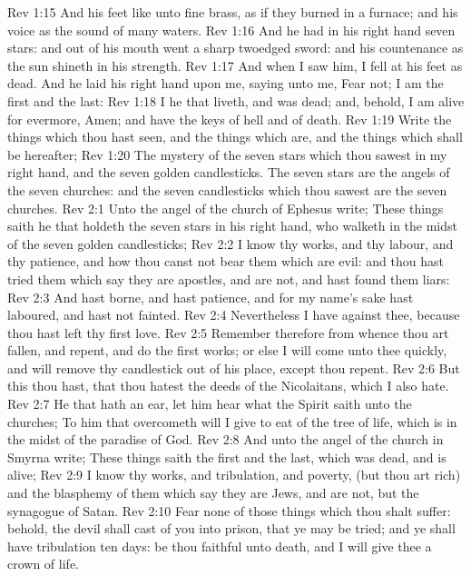 \vs Rev 1:15 And his feet like unto fine brass, as if they burned in a furnace; and his voice as the sound of many waters.
\vs Rev 1:16 And he had in his right hand seven stars: and out of his mouth went a sharp twoedged sword: and his countenance  as the sun shineth in his strength.
\vs Rev 1:17 And when I saw him, I fell at his feet as dead. And he laid his right hand upon me, saying unto me, Fear not; I am the first and the last:
\vs Rev 1:18 I  he that liveth, and was dead; and, behold, I am alive for evermore, Amen; and have the keys of hell and of death.
\vs Rev 1:19 Write the things which thou hast seen, and the things which are, and the things which shall be hereafter;
\vs Rev 1:20 The mystery of the seven stars which thou sawest in my right hand, and the seven golden candlesticks. The seven stars are the angels of the seven churches: and the seven candlesticks which thou sawest are the seven churches.
\vs Rev 2:1 Unto the angel of the church of Ephesus write; These things saith he that holdeth the seven stars in his right hand, who walketh in the midst of the seven golden candlesticks;
\vs Rev 2:2 I know thy works, and thy labour, and thy patience, and how thou canst not bear them which are evil: and thou hast tried them which say they are apostles, and are not, and hast found them liars:
\vs Rev 2:3 And hast borne, and hast patience, and for my name's sake hast laboured, and hast not fainted.
\vs Rev 2:4 Nevertheless I have  against thee, because thou hast left thy first love.
\vs Rev 2:5 Remember therefore from whence thou art fallen, and repent, and do the first works; or else I will come unto thee quickly, and will remove thy candlestick out of his place, except thou repent.
\vs Rev 2:6 But this thou hast, that thou hatest the deeds of the Nicolaitans, which I also hate.
\vs Rev 2:7 He that hath an ear, let him hear what the Spirit saith unto the churches; To him that overcometh will I give to eat of the tree of life, which is in the midst of the paradise of God.
\vs Rev 2:8 And unto the angel of the church in Smyrna write; These things saith the first and the last, which was dead, and is alive;
\vs Rev 2:9 I know thy works, and tribulation, and poverty, (but thou art rich) and  the blasphemy of them which say they are Jews, and are not, but  the synagogue of Satan.
\vs Rev 2:10 Fear none of those things which thou shalt suffer: behold, the devil shall cast  of you into prison, that ye may be tried; and ye shall have tribulation ten days: be thou faithful unto death, and I will give thee a crown of life.
